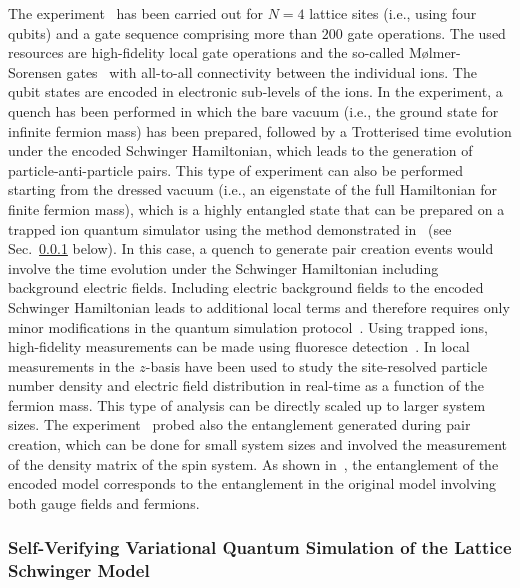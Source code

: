 \documentclass[epj,final]{svjour}
\begin{document}
The experiment~\cite{martinez2016real,muschik2017u} has been carried out for $N=4$ lattice sites (i.e., using four qubits) and a gate sequence comprising more than $200$ gate operations. The used resources are high-fidelity local gate operations and the so-called M{\o}lmer-Sorensen gates~\cite{MSgates} with all-to-all connectivity between the individual ions. The qubit states are encoded in electronic sub-levels of the ions. In the experiment, a quench has been performed in which the bare vacuum (i.e., the ground state for infinite fermion mass) has been prepared, followed by a Trotterised time evolution under the encoded Schwinger Hamiltonian, which leads to the generation of particle-anti-particle pairs. This type of experiment can also be performed starting from the dressed vacuum (i.e., an eigenstate of the full Hamiltonian for finite fermion mass), which is a highly entangled state that can be prepared on a trapped ion quantum simulator using the method demonstrated in~\cite{kokail2018self} (see Sec.~\ref{SVVQS} below). In this case, a quench to generate pair creation events would involve the time evolution under the Schwinger Hamiltonian including background electric fields. Including electric background fields to the encoded Schwinger Hamiltonian leads to additional local terms and therefore requires only minor modifications in the quantum simulation protocol~\cite{muschik2017u}. Using trapped ions, high-fidelity measurements can be made using fluoresce detection~\cite{Blatt2012,Schindler2013}. In \cite{martinez2016real,muschik2017u} local measurements in the $z$-basis have been used to study the site-resolved particle number density and electric field distribution in real-time as a function of the fermion mass. This type of analysis can be directly scaled up to larger system sizes. The experiment~\cite{martinez2016real,muschik2017u} probed also the entanglement generated during pair creation, which can be done for small system sizes and involved the measurement of the density matrix of the spin system. As shown in~\cite{martinez2016real,muschik2017u}, the entanglement of the encoded model corresponds to the entanglement in the original model involving both gauge fields and fermions.

\subsubsection{Self-Verifying Variational Quantum Simulation of the Lattice Schwinger Model\cite{kokail2018self}}
\label{SVVQS}
\end{document}
